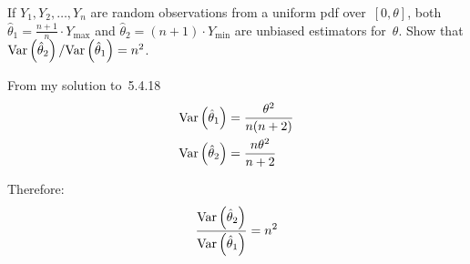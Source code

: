 \begin{problem}
   If ${Y_1,Y_2,\ldots,Y_n}$ are random observations from a uniform pdf over~${[0,\theta]}$, both ${\hat{\theta}_1 = \frac{n+1}{n} \cdot Y_{\max}}$ and ${\hat{\theta}_2 = (n+1) \cdot Y_{\min}}$ are unbiased estimators for~$\theta$.  Show that ${\text{Var}\left(\hat{\theta}_2\right) / \text{Var}\left(\hat{\theta}_1\right) = n^2}$.
\end{problem}

From my solution to~5.4.18
\begin{align}
  \text{Var}\left(\hat{\theta}_1\right) &= \frac{\theta^{2}}{n(n+2)}\\
  \text{Var}\left(\hat{\theta}_2\right) &= \frac{n\theta^{2}}{n+2}
\end{align}

Therefore:
\begin{equation}
  \frac{\text{Var}\left(\hat{\theta}_2\right)}{\text{Var}\left(\hat{\theta}_1\right)} = n^2
\end{equation}
